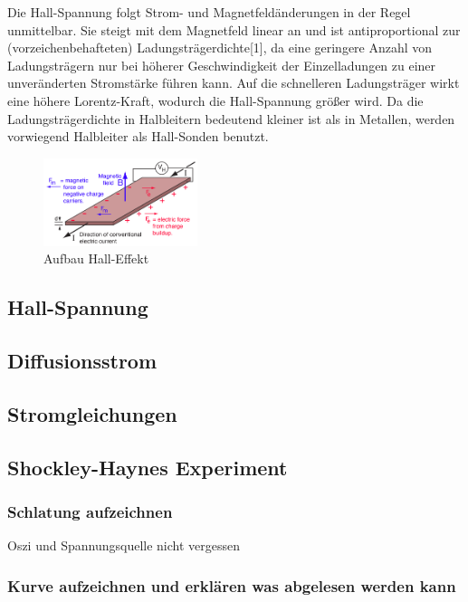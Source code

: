 Die Hall-Spannung folgt Strom- und Magnetfeldänderungen in der Regel unmittelbar. Sie steigt mit dem Magnetfeld linear an und ist antiproportional zur (vorzeichenbehafteten) Ladungsträgerdichte[1], da eine geringere Anzahl von Ladungsträgern nur bei höherer Geschwindigkeit der Einzelladungen zu einer unveränderten Stromstärke führen kann. Auf die schnelleren Ladungsträger wirkt eine höhere Lorentz-Kraft, wodurch die Hall-Spannung größer wird. Da die Ladungsträgerdichte in Halbleitern bedeutend kleiner ist als in Metallen, werden vorwiegend Halbleiter als Hall-Sonden benutzt.

\begin{figure}[H]
    \centering
    \includegraphics[width=0.4\textwidth]{fig/hall}
    \caption{Aufbau Hall-Effekt}
    \label{fig:hall}
\end{figure}

\subsection{Hall-Spannung }\label{k3:hallspannung}

\subsection{Diffusionsstrom }\label{k3:diffusionsstrom}

\subsection{Stromgleichungen }\label{k3:stromgleichungen}

\subsection{Shockley-Haynes Experiment }\label{k3:shockleyhaynes}
    \subsubsection{Schlatung aufzeichnen} Oszi und Spannungsquelle nicht vergessen
    \subsubsection{Kurve aufzeichnen und erkl\"aren was abgelesen werden kann}

